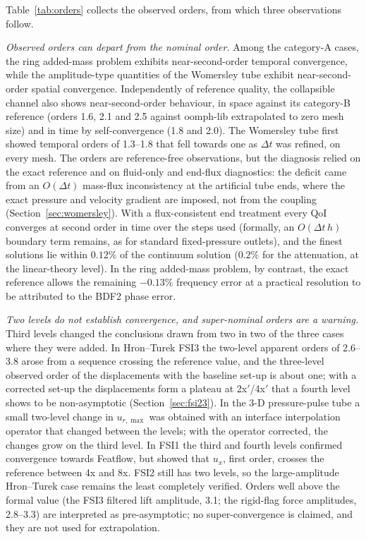Table~\ref{tab:orders} collects the observed orders, from which three observations follow.

\emph{Observed orders can depart from the nominal order.}
Among the category-A cases, the ring added-mass problem exhibits near-second-order temporal convergence, while the amplitude-type quantities of the Womersley tube exhibit near-second-order spatial convergence.
Independently of reference quality, the collapsible channel also shows near-second-order behaviour, in space against its category-B reference (orders 1.6, 2.1 and 2.5 against oomph-lib extrapolated to zero mesh size) and in time by self-convergence (1.8 and 2.0).
The Womersley tube first showed temporal orders of 1.3--1.8 that fell towards one as $\Delta t$ was refined, on every mesh.
The orders are reference-free observations, but the diagnosis relied on the exact reference and on fluid-only and end-flux diagnostics: the deficit came from an $O(\Delta t)$ mass-flux inconsistency at the artificial tube ends, where the exact pressure and velocity gradient are imposed, not from the coupling (Section~\ref{sec:womersley}).
With a flux-consistent end treatment every QoI converges at second order in time over the steps used (formally, an $O(\Delta t\,h)$ boundary term remains, as for standard fixed-pressure outlets), and the finest solutions lie within $0.12\%$ of the continuum solution ($0.2\%$ for the attenuation, at the linear-theory level).
In the ring added-mass problem, by contrast, the exact reference allows the remaining $-0.13\%$ frequency error at a practical resolution to be attributed to the BDF2 phase error.

\emph{Two levels do not establish convergence, and super-nominal orders are a warning.}
Third levels changed the conclusions drawn from two in two of the three cases where they were added.
In Hron--Turek FSI3 the two-level apparent orders of 2.6--3.8 arose from a sequence crossing the reference value, and the three-level observed order of the displacements with the baseline set-up is about one; with a corrected set-up the displacements form a plateau at 2x$'$/4x$'$ that a fourth level shows to be non-asymptotic (Section~\ref{sec:fsi23}).
In the 3-D pressure-pulse tube a small two-level change in $u_{r,\max}$ was obtained with an interface interpolation operator that changed between the levels; with the operator corrected, the changes grow on the third level.
In FSI1 the third and fourth levels confirmed convergence towards Featflow, but showed that $u_x$, first order, crosses the reference between 4x and 8x. FSI2 still has two levels, so the large-amplitude Hron--Turek case remains the least completely verified.
Orders well above the formal value (the FSI3 filtered lift amplitude, 3.1; the rigid-flag force amplitudes, 2.8--3.3) are interpreted as pre-asymptotic; no super-convergence is claimed, and they are not used for extrapolation.

